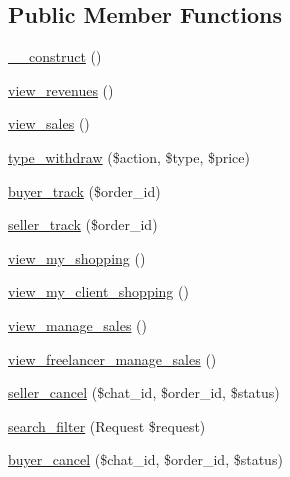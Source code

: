 \subsection*{Public Member Functions}
\begin{DoxyCompactItemize}
\item 
\mbox{\hyperlink{class_responsive_1_1_http_1_1_controllers_1_1_sales_controller_a095c5d389db211932136b53f25f39685}{\+\_\+\+\_\+construct}} ()
\item 
\mbox{\hyperlink{class_responsive_1_1_http_1_1_controllers_1_1_sales_controller_a6ab40143e21a521f539feafe14307097}{view\+\_\+revenues}} ()
\item 
\mbox{\hyperlink{class_responsive_1_1_http_1_1_controllers_1_1_sales_controller_a9c4ccb19926f4a518484fd42bb345272}{view\+\_\+sales}} ()
\item 
\mbox{\hyperlink{class_responsive_1_1_http_1_1_controllers_1_1_sales_controller_a312ebafadbee3f2196f02445219f3c66}{type\+\_\+withdraw}} (\$action, \$type, \$price)
\item 
\mbox{\hyperlink{class_responsive_1_1_http_1_1_controllers_1_1_sales_controller_a0c07b1ea236beecb7f99bc6b37eeb6f5}{buyer\+\_\+track}} (\$order\+\_\+id)
\item 
\mbox{\hyperlink{class_responsive_1_1_http_1_1_controllers_1_1_sales_controller_a43da16ddb7b2a42a082944a89080922f}{seller\+\_\+track}} (\$order\+\_\+id)
\item 
\mbox{\hyperlink{class_responsive_1_1_http_1_1_controllers_1_1_sales_controller_af9d02e3dd4c9de85335b63e07e271fc7}{view\+\_\+my\+\_\+shopping}} ()
\item 
\mbox{\hyperlink{class_responsive_1_1_http_1_1_controllers_1_1_sales_controller_a4b756bcdd0c878126d2aaf1c7c4c7c46}{view\+\_\+my\+\_\+client\+\_\+shopping}} ()
\item 
\mbox{\hyperlink{class_responsive_1_1_http_1_1_controllers_1_1_sales_controller_a369ca7780b30f19528a574b0bae35c72}{view\+\_\+manage\+\_\+sales}} ()
\item 
\mbox{\hyperlink{class_responsive_1_1_http_1_1_controllers_1_1_sales_controller_a06fea9782c9683f602d3e9b2711b0b9a}{view\+\_\+freelancer\+\_\+manage\+\_\+sales}} ()
\item 
\mbox{\hyperlink{class_responsive_1_1_http_1_1_controllers_1_1_sales_controller_a54c733ab6d5dfcff2ae4c96bd2cba854}{seller\+\_\+cancel}} (\$chat\+\_\+id, \$order\+\_\+id, \$status)
\item 
\mbox{\hyperlink{class_responsive_1_1_http_1_1_controllers_1_1_sales_controller_a3943fd5c1dc7b10adc4f2b77b67b5860}{search\+\_\+filter}} (Request \$request)
\item 
\mbox{\hyperlink{class_responsive_1_1_http_1_1_controllers_1_1_sales_controller_ae6476cb9150ea64e6ace4db49772bdd3}{buyer\+\_\+cancel}} (\$chat\+\_\+id, \$order\+\_\+id, \$status)
\end{DoxyCompactItemize}
